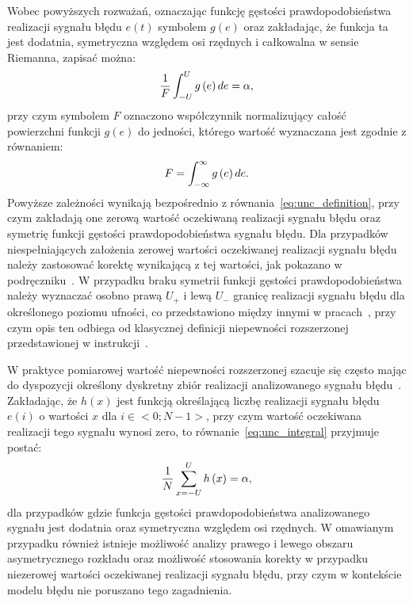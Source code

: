 Wobec powyższych rozważań, oznaczając funkcję gęstości prawdopodobieństwa realizacji sygnału błędu $e(t)$ symbolem $g(e)$ oraz zakładając, że funkcja ta jest dodatnia, symetryczna względem osi rzędnych i całkowalna w sensie Riemanna, zapisać można:
\begin{equation}
\frac{1}{F} \int _{-U} ^{U} g \left(e\right) de = \alpha \label{eq:unc_integral},
\end{equation}
przy czym symbolem $F$ oznaczono współczynnik normalizujący całość powierzchni funkcji $g(e)$ do jedności, którego wartość wyznaczana jest zgodnie z równaniem:
\begin{equation}
F = \int _{-\infty} ^{\infty} g \left(e\right) de \label{eq:unc_normalizer_int}.
\end{equation}
Powyższe zależności wynikają bezpośrednio z równania~\eqref{eq:unc_definition}, przy czym zakładają one zerową wartość oczekiwaną realizacji sygnału błędu oraz symetrię funkcji gęstości prawdopodobieństwa sygnału błędu. Dla przypadków niespełniających założenia zerowej wartości oczekiwanej realizacji sygnału błędu należy zastosować korektę wynikającą z tej wartości, jak pokazano w podręczniku~\cite{jakubiec_system}. W przypadku braku symetrii funkcji gęstości prawdopodobieństwa należy wyznaczać osobno prawą $U_{+}$ i lewą $U_{-}$ granicę realizacji sygnału błędu dla określonego poziomu ufności, co przedstawiono między innymi w pracach~\cite{roj_annuncertainty, wymyslo_range}, przy czym opis ten odbiega od klasycznej definicji niepewności rozszerzonej przedstawionej w instrukcji~\cite{jcgm_guide}.

W praktyce pomiarowej wartość niepewności rozszerzonej szacuje się często mając do dyspozycji określony dyskretny zbiór realizacji analizowanego sygnału błędu~\cite{jcgm_guide}. Zakładając, że $h(x)$ jest funkcją określającą liczbę realizacji sygnału błędu $e(i)$ o wartości $x$ dla $i \in <0;N-1>$, przy czym wartość oczekiwana realizacji tego sygnału wynosi zero, to równanie~\eqref{eq:unc_integral} przyjmuje postać:
\begin{equation}
\frac{1}{N} \sum _{x=-U} ^{U} h \left(x\right) = \alpha \label{eq:unc_summation},
\end{equation}
dla przypadków gdzie funkcja gęstości prawdopodobieństwa analizowanego sygnału jest dodatnia oraz symetryczna względem osi rzędnych. W omawianym przypadku również istnieje możliwość analizy prawego i lewego obszaru asymetrycznego rozkładu oraz możliwość stosowania korekty w przypadku niezerowej wartości oczekiwanej realizacji sygnału błędu, przy czym w kontekście modelu błędu nie poruszano tego zagadnienia.


